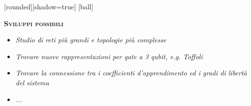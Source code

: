\documentclass[xcolor=x11names,compress]{beamer}
\renewcommand{\(}{\begin{columns}}
\renewcommand{\)}{\end{columns}}
\newcommand{\<}[1]{\begin{column}{#1}}
\renewcommand{\>}{\end{column}}
\begin{document}
\begin{frame}

[rounded][shadow=true]
[ball]

\begin{block}{\textbf{\textsc{Sviluppi possibili}}}

\begin{itemize}
\item \textsl{Studio di reti più grandi e topologie più complesse}
\item \textsl{Trovare nuove rappresentazioni per gate a 3 qubit, e.g. Toffoli}
\item \textsl{Trovare la connessione tra i coefficienti d'apprendimento ed i gradi di libertà del sistema}
\item \textsl{...}
\end{itemize}

\end{block}

\end{frame}

\end{document}
